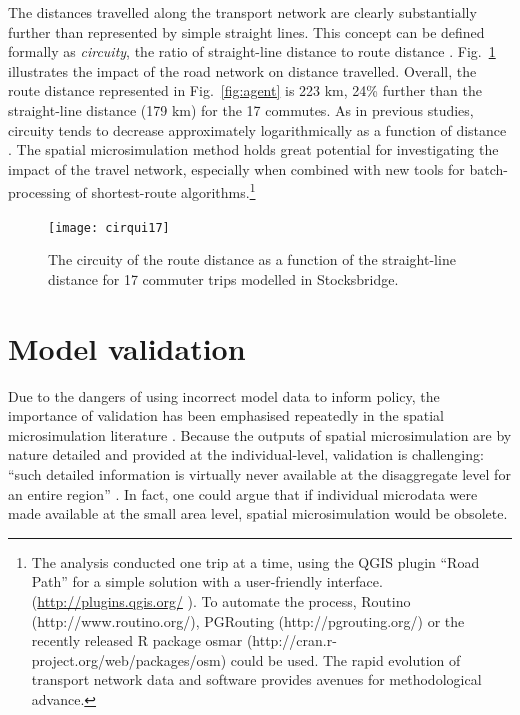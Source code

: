 The distances travelled along the transport network are clearly substantially
further than represented by simple straight lines. This concept can be
defined formally as \emph{circuity}, the ratio of straight-line distance
to route distance \citep{Ballou2002}. Fig.~\ref{f:circ} illustrates the impact
of the road network on distance travelled. Overall, the route distance
represented in Fig.~\ref{fig:agent} is 223 km, 24\% further
 than the straight-line distance (179 km) for the 17 commutes. As in previous
studies, circuity tends to decrease approximately logarithmically as a function
of distance \citep{Levinson2009}. The spatial microsimulation method holds
great potential for investigating the impact of the travel network, especially
when combined with new tools for batch-processing of shortest-route
algorithms.\footnote{The
analysis conducted one trip at a time, using the
QGIS plugin ``Road Path'' for a simple solution with a user-friendly interface.
(\href{http://docs.qgis.org/2.0/html/en/docs/user_manual/plugins/plugins_road_graph.html}
{http://plugins.qgis.org/} ).
To automate the process, Routino (http://www.routino.org/), PGRouting
(http://pgrouting.org/) or the recently released R package osmar
(http://cran.r-project.org/web/packages/osm) could be used.
The rapid evolution of transport network data and software
provides avenues for methodological advance.
}
\begin{figure}
\begin{center}
 \texttt{[image: cirqui17]}\end{center}
\caption[Circuity as a function of distance in Sheffield]
{The circuity of the route distance as a function of the
straight-line distance for 17 commuter trips modelled in Stocksbridge.}
\label{f:circ}
\end{figure}

\section{Model validation} \label{s:valid}
Due to the dangers of using incorrect model data to inform policy,
the importance of validation has been emphasised repeatedly in the
spatial microsimulation literature \citep{Holm1987, chin2006regional,
Smith2009,Clarke2010-valid, Ballas2013-4policy-analysis}.
Because the outputs of spatial microsimulation
are by nature detailed and provided at the individual-level, validation
is challenging: ``such detailed information is virtually never
available at the disaggregate level for an entire region''
\citep[p.~37]{Ravulaparthy2011}. In fact, one could argue that
if individual microdata were made available at the small area level,
spatial microsimulation would be obsolete.

